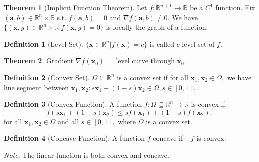 \documentclass[12pt]{article}
\theoremstyle{definition}
\theoremstyle{definition}
\newtheorem{thm}{Theorem}[section]
\theoremstyle{definition}
\theoremstyle{definition}
\theoremstyle{definition}
\newtheorem{definition}{Definition}[section]
\begin{document}
\begin{thm}[Implicit Function Theorem]
	Let $f: \mathbb{R}^{n+1}\to\mathbb{R}$ be a $C^1$ function. Fix $(\mathbf{a}, b)\in\mathbb{R}^n \times \mathbb{R}$ s.t. $f(\mathbf{a}, b)=0$ and $\nabla f(\mathbf{a}, b)\neq0.$ We have $\{(\mathbf{x}, y)\in\mathbb{R}^n\times\mathbb{R}|f(\mathbf{x}, y)=0\}$ is locally the graph of a function.
\end{thm}

\begin{definition}[Level Set]
	$\{\mathbf{x}\in\mathbb{R}^n|f(\mathbf{x})=c\}$ is called $c$-level set of $f.$
\end{definition}

\begin{thm}
	Gradient $\nabla f(\mathbf{x}_0) \perp$ level curve through $\mathbf{x}_0.$
\end{thm}

\begin{definition}[Convex Set]
	$\Omega \subseteq \mathbb{R}^n$ is a convex set if for all $\mathbf{x}_1, \mathbf{x}_2 \in \Omega,$ we have line segment between $\mathbf{x}_1, \mathbf{x}_2: s\mathbf{x}_1+(1-s)\mathbf{x}_2 \in \Omega, s \in [0, 1].$
\end{definition}

\begin{definition}[Convex Function]
	A function $f: \Omega \subseteq \mathbb{R}^n \to \mathbb{R}$ is convex if $$f(s\mathbf{x}_1+(1-s)\mathbf{x}_2) \leq sf(\mathbf{x}_1)+(1-s)f(\mathbf{x}_2),$$ for all $\mathbf{x}_1, \mathbf{x}_2 \in \Omega$ and all $s \in [0, 1],$ where $\Omega$ is a convex set.
\end{definition}

\begin{definition}[Concave Function]
	A function $f$ concave if $-f$ is convex.
\end{definition}

\noindent \emph{Note}. The linear function is both convex and concave.
\end{document}
